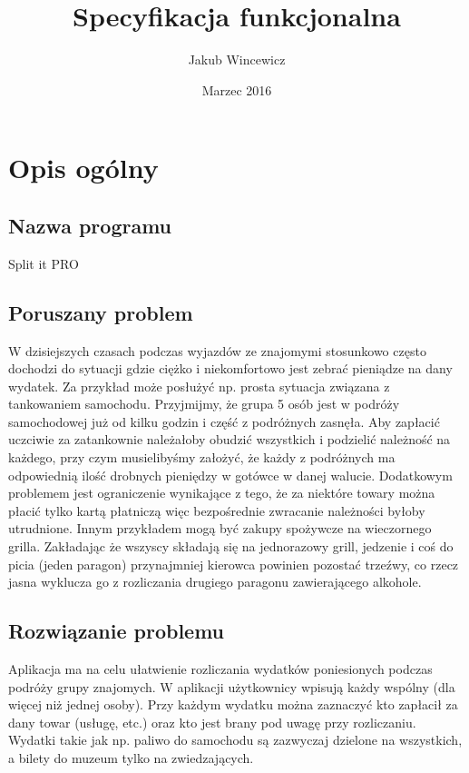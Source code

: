 \documentclass[12pt, letterpaper, ]{article}
\title{Specyfikacja funkcjonalna}
\author{Jakub Wincewicz}
\date{Marzec 2016}
\begin{document}
	
	\begin{titlepage}
		\maketitle
	\end{titlepage}
	
	\tableofcontents
	\newpage
	
	\section[Opis ogólny]{Opis ogólny}
		\subsection{Nazwa programu}
			Split it PRO
		\subsection{Poruszany problem}
			W dzisiejszych czasach podczas wyjazdów ze znajomymi stosunkowo często dochodzi do sytuacji gdzie ciężko i niekomfortowo jest zebrać pieniądze na dany wydatek. Za przykład może posłużyć np. prosta sytuacja związana z tankowaniem samochodu. Przyjmijmy, że grupa 5 osób jest w podróży samochodowej już od kilku godzin i część z podróżnych zasnęła. Aby zapłacić uczciwie za zatankownie należałoby obudzić wszystkich i podzielić należność na każdego, przy czym musielibyśmy założyć, że każdy z podróżnych ma odpowiednią ilość drobnych pieniędzy w gotówce w danej walucie.
		\newline
			Dodatkowym problemem jest ograniczenie wynikające z tego, że za niektóre towary można płacić tylko kartą płatniczą więc bezpośrednie zwracanie należności byłoby utrudnione. Innym przykładem mogą być zakupy spożywcze na wieczornego grilla. Zakładając że wszyscy składają się na jednorazowy grill, jedzenie i coś do picia (jeden paragon) przynajmniej kierowca powinien pozostać trzeźwy, co rzecz jasna wyklucza go z rozliczania drugiego paragonu zawierającego alkohole. 
		\subsection{Rozwiązanie problemu}
			Aplikacja ma na celu ułatwienie rozliczania wydatków poniesionych podczas podróży grupy znajomych. W aplikacji użytkownicy wpisują każdy wspólny (dla więcej niż jednej osoby). Przy każdym wydatku można zaznaczyć kto zapłacił za dany towar (usługę, etc.) oraz kto jest brany pod uwagę przy rozliczaniu. Wydatki takie jak np. paliwo do samochodu są zazwyczaj dzielone na wszystkich, a bilety do muzeum tylko na zwiedzających. 	
	
\end{document}
